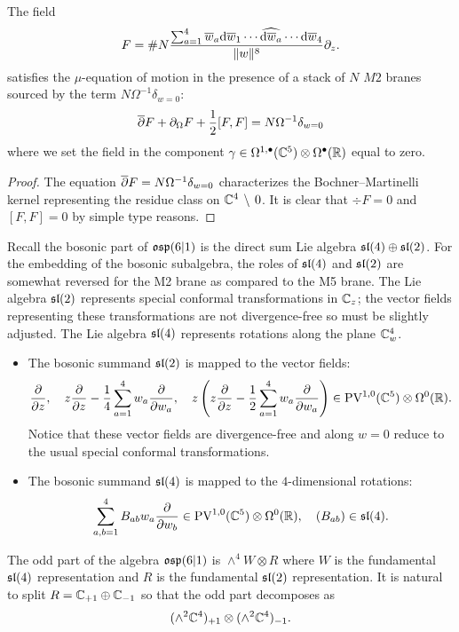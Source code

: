 \documentclass[11pt]{amsart}
\begin{document}
\begin{lem}
The field 
\[
F = \# N \frac{\sum_{a=1}^4 \overline{w}_a {\rm d} \overline{w}_1 \cdots \widehat{{\rm d} \overline{w}_a} \cdots {\rm d} \overline{w}_4}{\|w\|^{8}} \partial_z .
\]
satisfies the $\mu$-equation of motion in the presence of a stack of $N$ $M2$ branes sourced by the term $N \Omega^{-1} \delta_{w=0}$:
\[
\overline{\partial} F + \partial_{\Omega} F + \frac12 [F, F] = N \Omega^{-1} \delta_{w=0} 
\]
where we set the field in the component $\gamma \in \Omega^{1,\bullet}(\mathbb C^5) \otimes \Omega^\bullet(\mathbb R)$ equal to zero. 
\end{lem}

\begin{proof}
The equation $\overline{\partial} F = N \Omega^{-1} \delta_{w=0}$ characterizes the Bochner--Martinelli kernel representing the residue class on $\mathbb C^4 \, \setminus \, 0$. 
It is clear that $\div F = 0$ and $[F, F] = 0$ by simple type reasons. 
\end{proof}

\parsec[]

Recall the bosonic part of $\mathfrak{osp}(6|1)$ is the direct sum Lie algebra $\mathfrak{sl}(4) \oplus \mathfrak{sl}(2)$. 
For the embedding of the bosonic subalgebra, the roles of $\mathfrak{sl}(4)$ and $\mathfrak{sl}(2)$ are somewhat reversed for the M2 brane as compared to the M5 brane. 
The Lie algebra $\mathfrak{sl}(2)$ represents special conformal transformations in $\mathbb C_z$; the vector fields representing these transformations are not divergence-free so must be slightly adjusted. 
The Lie algebra $\mathfrak{sl}(4)$ represents rotations along the plane $\mathbb C^4_w$.   


\begin{itemize}
\item The bosonic summand $\mathfrak{sl}(2)$ is mapped to the vector fields:
\[
\frac{\partial}{\partial z} ,\quad z \frac{\partial}{\partial z} - \frac14 \sum_{a=1}^4 w_a \frac{\partial}{\partial w_a} , \quad z \left(z \frac{\partial}{\partial z} - \frac12 \sum_{a=1}^4 w_a \frac{\partial}{\partial w_a} \right) \in {\rm PV}^{1,0}(\mathbb C^5) \otimes \Omega^0(\mathbb R) .
\]
Notice that these vector fields are divergence-free and along $w=0$ reduce to the usual special conformal transformations.
\item The bosonic summand $\mathfrak{sl}(4)$ is mapped to the $4$-dimensional rotations: 
\[
\sum_{a,b=1}^4 B_{ab} w_a \frac{\partial}{\partial w_b} \in {\rm PV}^{1,0}(\mathbb C^5) \otimes \Omega^0(\mathbb R) , \quad (B_{ab}) \in \mathfrak{sl}(4) .
\]
\end{itemize}

The odd part of the algebra $\mathfrak{osp}(6|1)$ is $\wedge^4 W \otimes R$ where $W$ is the fundamental $\mathfrak{sl}(4)$ representation and $R$ is the fundamental $\mathfrak{sl}(2)$ representation. 
It is natural to split $R = \mathbb C_{+1} \oplus \mathbb C_{-1}$ so that the odd part decomposes as
\[
(\wedge^2 \mathbb C^4)_{+1} \otimes (\wedge^2 \mathbb C^4)_{-1} .
\]
\end{document}
